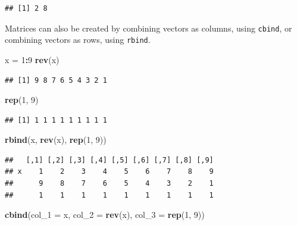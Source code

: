 \documentclass[]{book}
\newenvironment{Shaded}{\begin{snugshade}}{\end{snugshade}}
\newcommand{\KeywordTok}[1]{\textcolor[rgb]{0.13,0.29,0.53}{\textbf{#1}}}
\newcommand{\DataTypeTok}[1]{\textcolor[rgb]{0.13,0.29,0.53}{#1}}
\newcommand{\DecValTok}[1]{\textcolor[rgb]{0.00,0.00,0.81}{#1}}
\newcommand{\StringTok}[1]{\textcolor[rgb]{0.31,0.60,0.02}{#1}}
\newcommand{\OperatorTok}[1]{\textcolor[rgb]{0.81,0.36,0.00}{\textbf{#1}}}
\newcommand{\NormalTok}[1]{#1}
\theoremstyle{definition}
\theoremstyle{definition}
\theoremstyle{definition}
\theoremstyle{remark}
\begin{document}
\begin{verbatim}
## [1] 2 8
\end{verbatim}

Matrices can also be created by combining vectors as columns, using
\texttt{cbind}, or combining vectors as rows, using \texttt{rbind}.

\begin{Shaded}
\begin{Highlighting}[]
\NormalTok{x =}\StringTok{ }\DecValTok{1}\OperatorTok{:}\DecValTok{9}
\KeywordTok{rev}\NormalTok{(x)}
\end{Highlighting}
\end{Shaded}

\begin{verbatim}
## [1] 9 8 7 6 5 4 3 2 1
\end{verbatim}

\begin{Shaded}
\begin{Highlighting}[]
\KeywordTok{rep}\NormalTok{(}\DecValTok{1}\NormalTok{, }\DecValTok{9}\NormalTok{)}
\end{Highlighting}
\end{Shaded}

\begin{verbatim}
## [1] 1 1 1 1 1 1 1 1 1
\end{verbatim}

\begin{Shaded}
\begin{Highlighting}[]
\KeywordTok{rbind}\NormalTok{(x, }\KeywordTok{rev}\NormalTok{(x), }\KeywordTok{rep}\NormalTok{(}\DecValTok{1}\NormalTok{, }\DecValTok{9}\NormalTok{))}
\end{Highlighting}
\end{Shaded}

\begin{verbatim}
##   [,1] [,2] [,3] [,4] [,5] [,6] [,7] [,8] [,9]
## x    1    2    3    4    5    6    7    8    9
##      9    8    7    6    5    4    3    2    1
##      1    1    1    1    1    1    1    1    1
\end{verbatim}

\begin{Shaded}
\begin{Highlighting}[]
\KeywordTok{cbind}\NormalTok{(}\DataTypeTok{col_1 =}\NormalTok{ x, }\DataTypeTok{col_2 =} \KeywordTok{rev}\NormalTok{(x), }\DataTypeTok{col_3 =} \KeywordTok{rep}\NormalTok{(}\DecValTok{1}\NormalTok{, }\DecValTok{9}\NormalTok{))}
\end{Highlighting}
\end{Shaded}
\end{document}
